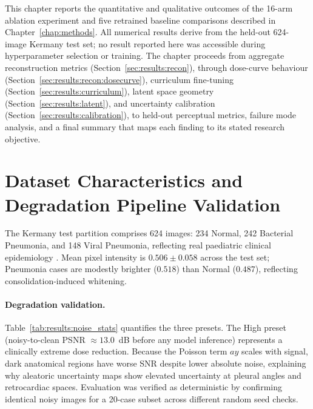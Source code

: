 \documentclass[12pt, a4paper, twoside, openright]{book}
\begin{document}
This chapter reports the quantitative and qualitative outcomes of the 16-arm ablation experiment and five retrained baseline comparisons described in Chapter~\ref{chap:methods}. All numerical results derive from the held-out 624-image Kermany test set; no result reported here was accessible during hyperparameter selection or training. The chapter proceeds from aggregate reconstruction metrics (Section~\ref{sec:results:recon}), through dose-curve behaviour (Section~\ref{sec:results:recon:dosecurve}), curriculum fine-tuning (Section~\ref{sec:results:curriculum}), latent space geometry (Section~\ref{sec:results:latent}), and uncertainty calibration (Section~\ref{sec:results:calibration}), to held-out perceptual metrics, failure mode analysis, and a final summary that maps each finding to its stated research objective.


\section{Dataset Characteristics and Degradation Pipeline Validation}
\label{sec:results:dataset}

The Kermany test partition comprises 624 images: 234 Normal, 242 Bacterial Pneumonia, and 148 Viral Pneumonia, reflecting real paediatric clinical epidemiology \cite{kermany_identifying_2018}. Mean pixel intensity is $0.506 \pm 0.058$ across the test set; Pneumonia cases are modestly brighter ($0.518$) than Normal ($0.487$), reflecting consolidation-induced whitening.

\paragraph{Degradation validation.}
Table~\ref{tab:results:noise_stats} quantifies the three presets. The High preset (noisy-to-clean PSNR $\approx 13.0$~dB before any model inference) represents a clinically extreme dose reduction. Because the Poisson term $ay$ scales with signal, dark anatomical regions have worse SNR despite lower absolute noise, explaining why aleatoric uncertainty maps show elevated uncertainty at pleural angles and retrocardiac spaces. Evaluation was verified as deterministic by confirming identical noisy images for a 20-case subset across different random seed checks.
\end{document}
